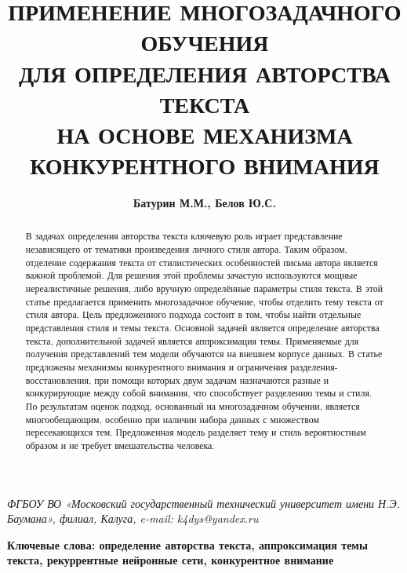 \title{\textbf{ПРИМЕНЕНИЕ МНОГОЗАДАЧНОГО ОБУЧЕНИЯ\\
    ДЛЯ ОПРЕДЕЛЕНИЯ АВТОРСТВА ТЕКСТА\\
    НА ОСНОВЕ МЕХАНИЗМА КОНКУРЕНТНОГО ВНИМАНИЯ}}
\author{\textbf{Батурин М.М., Белов Ю.С.}}
\date{} 
\maketitle

\textit{ФГБОУ ВО «Московский государственный технический университет имени Н.Э. Баумана», 
филиал, Калуга, e-mail: k4dys@yandex.ru}

\begin{abstract}
    В задачах определения авторства текста ключевую роль играет представление независящего от тематики произведения личного стиля автора. Таким образом, отделение содержания текста от стилистических 
особенностей письма автора является важной проблемой. Для решения этой проблемы зачастую используются мощные нереалистичные решения, либо вручную определённые параметры стиля текста. В этой 
статье предлагается применить многозадачное обучение, чтобы отделить тему текста от стиля автора. Цель 
предложенного подхода состоит в том, чтобы найти отдельные представления стиля и темы текста. 
Основной задачей является определение авторства текста, дополнительной задачей является аппроксимация темы. 
Применяемые для получения представлений тем модели обучаются на внешнем корпусе данных. В статье 
предложены механизмы конкурентного внимания и ограничения разделения-восстановления, при помощи 
которых двум задачам назначаются разные и конкурирующие между собой внимания, что способствует разделению темы и стиля. По результатам оценок подход, основанный на многозадачном обучении, является 
многообещающим, особенно при наличии набора данных с множеством пересекающихся тем. Предложенная модель 
разделяет тему и стиль вероятностным образом и не требует вмешательства человека.
\end{abstract}
\textbf{Ключевые слова: определение авторства текста, аппроксимация темы текста, рекуррентные нейронные сети, 
конкурентное внимание}
